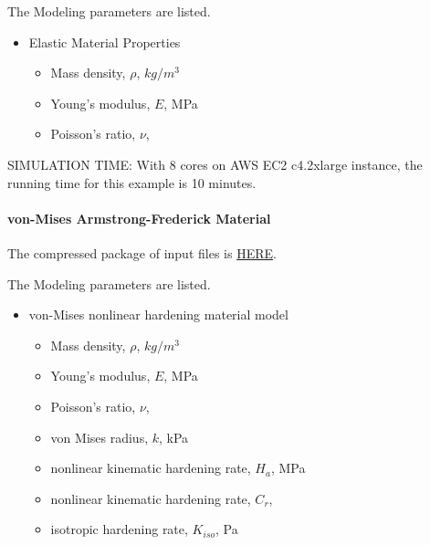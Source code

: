The Modeling parameters are listed.
\begin{itemize}
  \item Elastic Material Properties 
  \begin{itemize}
    \item Mass density, $\rho$, \enspace {} $kg/m^3$
    \item Young's modulus, $E$, \enspace {} MPa
    \item Poisson's ratio, $\nu$, \enspace {}
  \end{itemize}
\end{itemize}


SIMULATION TIME: With 8 cores on AWS EC2 c4.2xlarge instance, the running time for this example is 10 minutes.

\paragraph{von-Mises Armstrong-Frederick Material}
The compressed package of input files is  
\href{https://github.com/yuan-energy/Real-ESSI-Short-Course-Examples/tree/master/short-course-examples/nonlinear_analysis_steps/soil-structure/vonMisesArmstrongFrederick/vonMisesArmstrongFrederick.tgz?raw=true}{HERE}. 


The Modeling parameters are listed.
\begin{itemize}
  \item von-Mises nonlinear hardening material model 
  \begin{itemize}
    \item Mass density, $\rho$, \enspace {} $kg/m^3$
    \item Young's modulus, $E$, \enspace {} MPa
    \item Poisson's ratio, $\nu$, \enspace {}
    \item von Mises radius, $k$, \enspace {} kPa
    \item nonlinear kinematic hardening rate, $H_a$, \enspace {} MPa
    \item nonlinear kinematic hardening rate, $C_r$, \enspace {}
    \item isotropic hardening rate, $K_{iso}$, \enspace {} Pa
  \end{itemize}
\end{itemize}


